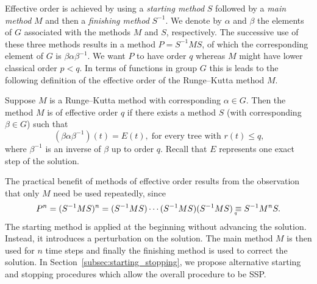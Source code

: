 Effective order is achieved by using a \emph{starting method} $S$
followed by a \emph{main method} $M$
and then a \emph{finishing method} $S^{-1}$.
We denote by $\alpha$ and $\beta$ the elements of $G$ associated with the methods $M$ and $S$, respectively.
The successive use of these three methods results in a method $P = S^{-1}MS$, of which the corresponding element of $G$ is $\beta\alpha\beta^{-1}$.
We want $P$ to have order $q$ whereas $M$ might have lower classical
order $p < q$.
In terms of functions in group $G$ this is leads to the following definition of the effective order of the Runge--Kutta method $M$.
\begin{definition}\cite{Butcher1987_book}\label{def:Effective_order}
  Suppose $M$ is a Runge--Kutta method with corresponding $\alpha \in G$.
  Then the method $M$ is of effective order $q$ if there exists a method
  $S$ (with corresponding $\beta \in G$) such that
	\begin{equation}\label{eq:Effective_order_1}
		(\beta\alpha\beta^{-1})(t) = E(t), \; \text{for every tree with $r(t) \leq q$,}
	\end{equation}
        where $\beta^{-1}$ is an inverse of $\beta$ up to order $q$.
        Recall that $E$ represents one exact step of the solution.
\end{definition}
The practical benefit of methods of effective order results from the
observation that only $M$ need be used repeatedly, since
\begin{displaymath}
	P^n = (S^{-1}MS)^n = (S^{-1}MS) \cdots (S^{-1}MS) (S^{-1}MS) \underaccent{q}{\equiv} S^{-1} M^n S.
\end{displaymath}
The starting method is applied at the beginning without advancing the
solution.
Instead, it introduces a perturbation on the solution.
The main method \( M \) is then used for \( n \) time steps and finally the
finishing method is used to correct the solution.
In Section~\ref{subsec:starting_stopping}, we propose alternative
starting and stopping procedures which allow the overall procedure to
be SSP.

